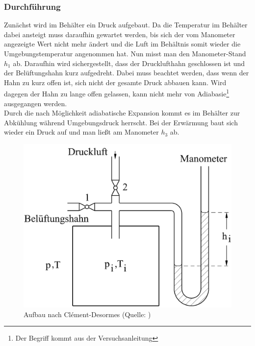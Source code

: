 \subsubsection{Durchführung}
Zunächst wird im Behälter ein Druck aufgebaut. Da die Temperatur im Behälter dabei ansteigt muss daraufhin gewartet werden, bis sich der vom Manometer angezeigte Wert nicht mehr ändert und die Luft im Behältnis somit wieder die Umgebungstemperatur angenommen hat.
Nun misst man den Manometer-Stand $ h_1 $ ab.
Daraufhin wird sichergestellt, dass der Drucklufthahn geschlossen ist und der Belüftungshahn kurz aufgedreht. Dabei muss beachtet werden, dass wenn der Hahn zu kurz offen ist, sich nicht der gesamte Druck abbauen kann. Wird dagegen der Hahn zu lange offen gelassen, kann nicht mehr von Adiabasie\footnote{Der Begriff kommt aus der Versuchsanleitung} ausgegangen werden.\\
Durch die nach Möglichkeit adiabatische Expansion kommt es im Behälter zur Abkühlung während Umgebungsdruck herrscht.
Bei der Erwärmung baut sich wieder ein Druck auf und man ließt am Manometer $ h_3 $ ab.
\begin{figure}[H]
\centering
\includegraphics[width=0.7\linewidth]{./bilder/versuch2}
\caption{Aufbau nach Clément-Desormes (Quelle: \cite{anleitung2015})}
\label{fig:aufbau2}
\end{figure}

